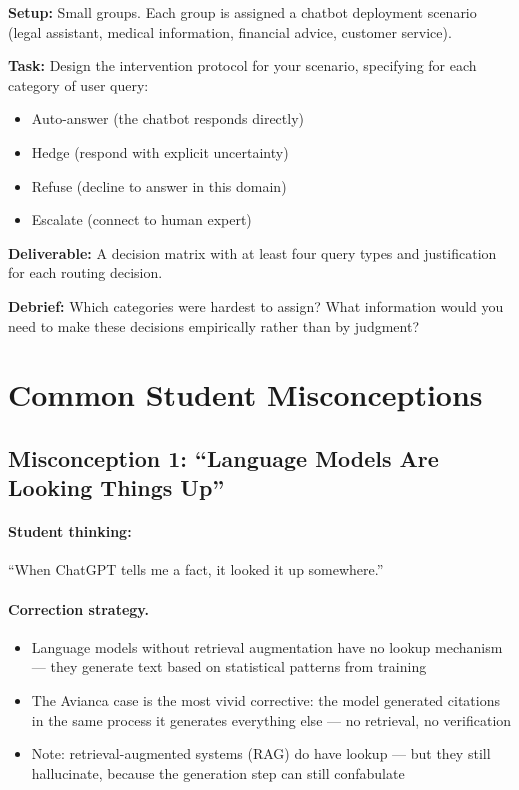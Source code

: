 \textbf{Setup:} Small groups. Each group is assigned a chatbot deployment scenario (legal assistant, medical information, financial advice, customer service).

\textbf{Task:} Design the intervention protocol for your scenario, specifying for each category of user query:
\begin{itemize}
    \item Auto-answer (the chatbot responds directly)
    \item Hedge (respond with explicit uncertainty)
    \item Refuse (decline to answer in this domain)
    \item Escalate (connect to human expert)
\end{itemize}

\textbf{Deliverable:} A decision matrix with at least four query types and justification for each routing decision.

\textbf{Debrief:} Which categories were hardest to assign? What information would you need to make these decisions empirically rather than by judgment?

\section{Common Student Misconceptions}

\subsection{Misconception 1: ``Language Models Are Looking Things Up''}

\paragraph{Student thinking:} ``When ChatGPT tells me a fact, it looked it up somewhere.''

\paragraph{Correction strategy.}
\begin{itemize}
    \item Language models without retrieval augmentation have no lookup mechanism --- they generate text based on statistical patterns from training
    \item The Avianca case is the most vivid corrective: the model generated citations in the same process it generates everything else --- no retrieval, no verification
    \item Note: retrieval-augmented systems (RAG) do have lookup --- but they still hallucinate, because the generation step can still confabulate
\end{itemize}

